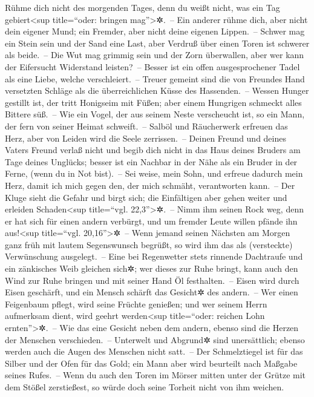 Rühme dich nicht des morgenden Tages, denn du weißt nicht,
was ein Tag gebiert\textless sup title=``oder: bringen
mag''\textgreater✲.~-- Ein anderer rühme dich, aber nicht
dein eigener Mund; ein Fremder, aber nicht deine eigenen Lippen.~--
Schwer mag ein Stein sein und der Sand eine Last, aber
Verdruß über einen Toren ist schwerer als beide.~-- Die
Wut mag grimmig sein und der Zorn überwallen, aber wer kann der
Eifersucht Widerstand leisten?~-- Besser ist ein offen
ausgesprochener Tadel als eine Liebe, welche verschleiert.~--
Treuer gemeint sind die von Freundes Hand versetzten
Schläge als die überreichlichen Küsse des Hassenden.~--
Wessen Hunger gestillt ist, der tritt Honigseim mit Füßen;
aber einem Hungrigen schmeckt alles Bittere süß.~-- Wie
ein Vogel, der aus seinem Neste verscheucht ist, so ein Mann, der fern
von seiner Heimat schweift.~-- Salböl und Räucherwerk
erfreuen das Herz, aber von Leiden wird die Seele zerrissen.~--
Deinen Freund und deines Vaters Freund verlaß nicht und
begib dich nicht in das Haus deines Bruders am Tage deines Unglücks;
besser ist ein Nachbar in der Nähe als ein Bruder in der Ferne, (wenn du
in Not bist).~-- Sei weise, mein Sohn, und erfreue
dadurch mein Herz, damit ich mich gegen den, der mich schmäht,
verantworten kann.~-- Der Kluge sieht die Gefahr und
birgt sich; die Einfältigen aber gehen weiter und erleiden
Schaden\textless sup title=``vgl. 22,3''\textgreater✲.~--
Nimm ihm seinen Rock weg, denn er hat sich für einen
andern verbürgt, und um fremder Leute willen pfände ihn
aus!\textless sup title=``vgl. 20,16''\textgreater✲~--
Wenn jemand seinen Nächsten am Morgen ganz früh mit
lautem Segenswunsch begrüßt, so wird ihm das als (versteckte)
Verwünschung ausgelegt.~-- Eine bei Regenwetter stets
rinnende Dachtraufe und ein zänkisches Weib gleichen sich✲;
wer dieses zur Ruhe bringt, kann auch den Wind zur Ruhe
bringen und mit seiner Hand Öl festhalten.~-- Eisen wird
durch Eisen geschärft, und ein Mensch schärft das Gesicht✲ des
andern.~-- Wer einen Feigenbaum pflegt, wird seine
Früchte genießen; und wer seinem Herrn aufmerksam dient, wird geehrt
werden\textless sup title=``oder: reichen Lohn ernten''\textgreater✲.~--
Wie das eine Gesicht neben dem andern, ebenso sind die
Herzen der Menschen verschieden.~-- Unterwelt und
Abgrund✲ sind unersättlich; ebenso werden auch die Augen des Menschen
nicht satt.~-- Der Schmelztiegel ist für das Silber und
der Ofen für das Gold; ein Mann aber wird beurteilt nach Maßgabe seines
Rufes.~-- Wenn du auch den Toren im Mörser mitten unter
der Grütze mit dem Stößel zerstießest, so würde doch seine Torheit nicht
von ihm weichen.


